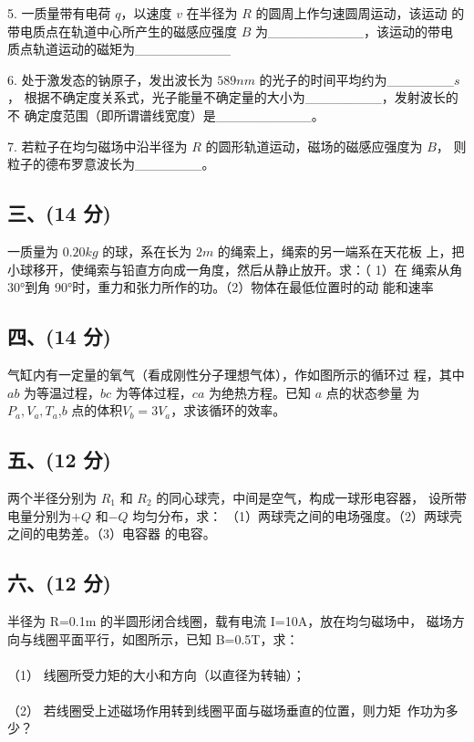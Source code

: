 5. 一质量带有电荷 $q$，以速度 $v$ 在半径为 $R$ 的圆周上作匀速圆周运动，该运动
的带电质点在轨道中心所产生的磁感应强度 $B$ 为__________，该运动的带电
质点轨道运动的磁矩为__________

6. 处于激发态的钠原子，发出波长为 $589nm$ 的光子的时间平均约为_______$s$，
根据不确定度关系式，光子能量不确定量的大小为________，发射波长的不
确定度范围（即所谓谱线宽度）是__________。

7. 若粒子在均匀磁场中沿半径为 $R$ 的圆形轨道运动，磁场的磁感应强度为 $B$，
则粒子的德布罗意波长为_______。
\subsection{三、(14 分)}
一质量为 $0.20kg$ 的球，系在长为 $2m$ 的绳索上，绳索的另一端系在天花板
上，把小球移开，使绳索与铅直方向成一角度，然后从静止放开。求：（ 1）在
绳索从角 30°到角 90°时，重力和张力所作的功。（2）物体在最低位置时的动
能和速率
\subsection{四、(14 分)}
气缸内有一定量的氧气（看成刚性分子理想气体），作如图所示的循环过
程，其中 $ab$ 为等温过程，$bc$ 为等体过程，$ca$ 为绝热方程。已知 $a$ 点的状态参量
为$P_a,V_a,T_a$,$b$ 点的体积$V_b=3V_a$，求该循环的效率。
\subsection{五、(12 分)}
两个半径分别为 $R_1$ 和 $R_2$ 的同心球壳，中间是空气，构成一球形电容器，
设所带电量分别为$+Q$ 和$-Q$ 均匀分布，求：
（1）两球壳之间的电场强度。（2）两球壳之间的电势差。（3）电容器
的电容。
\subsection{六、(12 分)}
半径为 R=0.1m 的半圆形闭合线圈，载有电流 I=10A，放在均匀磁场中，
磁场方向与线圈平面平行，如图所示，已知 B=0.5T，求：\\\\
（1） 线圈所受力矩的大小和方向（以直径为转轴）；\\\\
（2） 若线圈受上述磁场作用转到线圈平面与磁场垂直的位置，则力矩\
作功为多少？